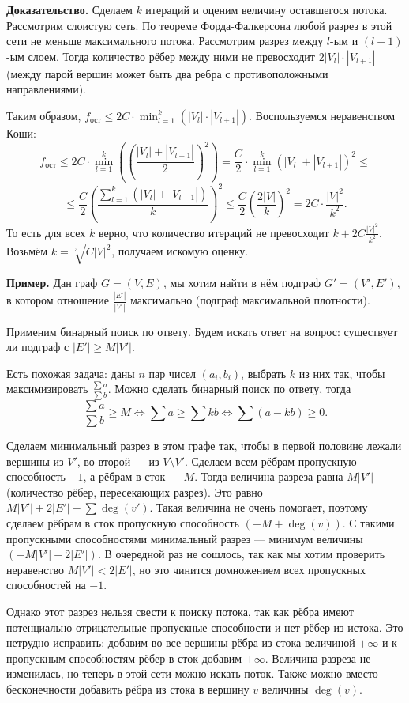 \textbf{Доказательство.} Сделаем $k$ итераций и оценим величину оставшегося потока.
Рассмотрим слоистую сеть. По теореме Форда-Фалкерсона любой разрез в этой сети не меньше максимального потока.
Рассмотрим разрез между $l$-ым и $(l+1)$-ым слоем. Тогда количество рёбер между ними не превосходит $2|V_l| \cdot |V_{l+1}|$ (между парой вершин может быть два ребра с противоположными направлениями).

Таким образом, $f_{\text{ост}} \le 2C \cdot \min_{l=1}^{k} (|V_l| \cdot |V_{l+1}|)$.
Воспользуемся неравенством Коши: 
\[
    f_{\text{ост}} \le 2C \cdot \min_{l=1}^{k} \left( \left(\frac{|V_l| + |V_{l+1}|}{2} \right)^2 \right) = \frac{C}{2} \cdot \min_{l=1}^{k} (|V_l| + |V_{l+1}|)^2 \le
\]
\[
    \le \frac{C}{2} \left( \frac{\sum_{l=1}^{k} (|V_l| + |V_{l+1}|)}{k} \right)^2 \le \frac{C}{2} \left( \frac{2|V|}{k} \right)^2 = 2C \cdot \frac{|V|^2}{k^2}.
\]
То есть для всех $k$ верно, что количество итераций не превосходит $k + 2C \frac{|V|^2}{k^2}$.
Возьмём $k = \sqrt[3]{C |V|^2}$, получаем искомую оценку.

\textbf{Пример.} Дан граф $G = (V, E)$, мы хотим найти в нём подграф $G' = (V', E')$, в котором отношение $\frac{|E'|}{|V'|}$ максимально (подграф максимальной плотности).

Применим бинарный поиск по ответу. Будем искать ответ на вопрос: существует ли подграф с $|E'| \ge M |V'|$.

Есть похожая задача: даны $n$ пар чисел $(a_i, b_i)$, выбрать $k$ из них так, чтобы максимизировать $\frac{\sum a}{\sum b}$.
Можно сделать бинарный поиск по ответу, тогда 
\[
    \frac{\sum a}{\sum b} \ge M \iff \sum a \ge \sum kb \iff \sum (a - kb) \ge 0.
\]

Сделаем минимальный разрез в этом графе так, чтобы в первой половине лежали вершины из $V'$, во второй --- из $V \setminus V'$.
Сделаем всем рёбрам пропускную способность $-1$, а рёбрам в сток --- $M$. 
Тогда величина разреза равна $M|V'| - $ (количество рёбер, пересекающих разрез).
Это равно $M|V'| + 2|E'| - \sum \deg(v')$.
Такая величина не очень помогает, поэтому сделаем рёбрам в сток пропускную способность $(-M + \deg(v))$.
С такими пропускными способностями минимальный разрез --- минимум величины $(-M|V'| + 2|E'|)$.
В очередной раз не сошлось, так как мы хотим проверить неравенство $M|V'| < 2|E'|$, но это чинится домножением всех пропускных способностей на $-1$.

Однако этот разрез нельзя свести к поиску потока, так как рёбра имеют потенциально отрицательные пропускные способности и нет рёбер из истока.
Это нетрудно исправить: добавим во все вершины рёбра из стока величиной $+\infty$ и к пропускным способностям рёбер в сток добавим $+\infty$.
Величина разреза не изменилась, но теперь в этой сети можно искать поток.
Также можно вместо бесконечности добавить рёбра из стока в вершину $v$ величины $\deg(v)$.

